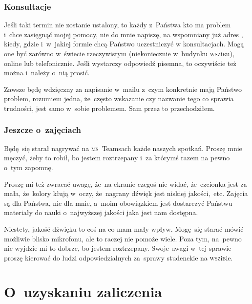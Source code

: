 \documentclass[10pt,t]{beamer}
\begin{document}
\begin{frame}
  \frametitle{Konsultacje}


  Jeśli taki termin nie zostanie ustalony, to każdy z~Państwa kto ma
  problem i~chce zasięgnąć mojej pomocy, nie do mnie napiszę, na
  wspomniany już adres \email, kiedy, gdzie i~w~jakiej formie chcą Państwo
  uczestniczyć w konsultacjach. Mogą one być zarówno w~świecie rzeczywistym
  (niekoniecznie w~budynku \textsc{wsz}i\textsc{b}u), online lub
  telefonicznie. Jeśli wystarczy odpowiedź pisemna, to oczywiście
  też można i~należy o~nią prosić.

  Zawsze będę wdzięczny za napisanie w~mailu z~czym konkretnie mają Państwo
  problem, rozumiem jedna, że~często wskazanie czy nazwanie tego co sprawia
  trudności, jest samo w~sobie problemem. Sam przez to przechodziłem.

\end{frame}





\begin{frame}
  \frametitle{Jeszcze o~zajęciach}


  Będę~się starał nagrywać na \textsc{ms}~Teamsach każde naszych spotkań.
  Proszę mnie męczyć, żeby to robił, bo jestem roztrzepany i~za którymś
  razem na pewno o~tym zapomnę.

  Proszę mi też zwracać uwagę, że~na ekranie czegoś nie widać,
  że~czcionka jest za mała, że~kolory kłują w~oczy, że~nagrany dźwięk
  jest niskiej jakości,~etc. Zajęcia są dla Państwa, nie dla mnie, a~moim
  obowiązkiem jest dostarczyć Państwu materiały do nauki o~najwyższej
  jakości jaka jest nam dostępna.

  Niestety, jakość dźwięku to coś na co mam mały wpływ. Mogę~się starać
  mówić możliwie blisko mikrofonu, ale to raczej nie pomoże wiele.
  Poza tym, na~pewno nie wyjdzie mi to dobrze, bo jestem roztrzepany.
  Swoje uwagi w~tej sprawie proszę kierować do ludzi odpowiedzialnych
  za~sprawy studenckie na \textsc{wsz}i\textsc{b}ie.

\end{frame}










\section{O~uzyskaniu zaliczenia}
\end{document}
